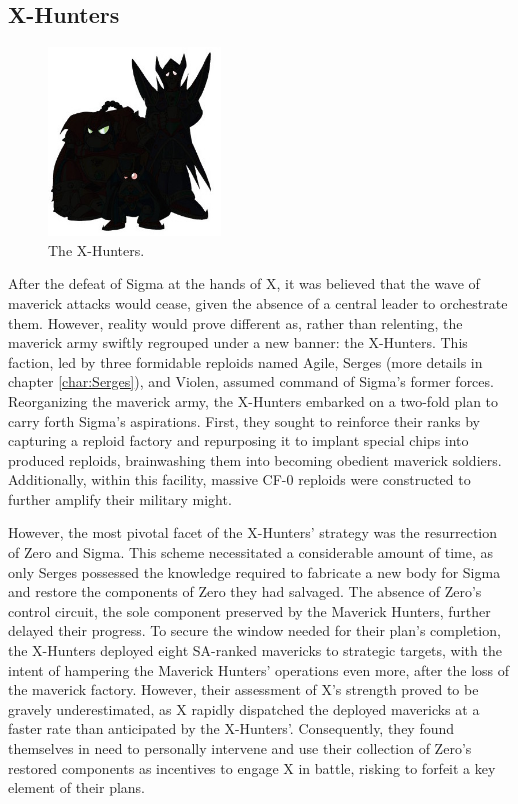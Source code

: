 \subsection{X-Hunters}
\begin{figure}[htp]
	\centering
	\includegraphics[height=5cm]{figures/X2/Enemies/X_Hunters.jpg}
	\caption{The X-Hunters.}
\end{figure}

After the defeat of Sigma at the hands of X, it was believed that the wave of maverick attacks would cease, given the absence of a central leader to orchestrate them. However, reality would prove different as, rather than relenting, the maverick army swiftly regrouped under a new banner: the X-Hunters. This faction, led by three formidable reploids named Agile, Serges (more details in chapter \ref{char:Serges}), and Violen, assumed command of Sigma's former forces. Reorganizing the maverick army, the X-Hunters embarked on a two-fold plan to carry forth Sigma's aspirations. First, they sought to reinforce their ranks by capturing a reploid factory and repurposing it to implant special chips into produced reploids, brainwashing them into becoming obedient maverick soldiers. Additionally, within this facility, massive CF-0 reploids were constructed to further amplify their military might.

However, the most pivotal facet of the X-Hunters' strategy was the resurrection of Zero and Sigma. This scheme necessitated a considerable amount of time, as only Serges possessed the knowledge required to fabricate a new body for Sigma and restore the components of Zero they had salvaged. The absence of Zero's control circuit, the sole component preserved by the Maverick Hunters, further delayed their progress. To secure the window needed for their plan's completion, the X-Hunters deployed eight SA-ranked mavericks to strategic targets, with the intent of hampering the Maverick Hunters' operations even more, after the loss of the maverick factory. However, their assessment of X's strength proved to be gravely underestimated, as X rapidly dispatched the deployed mavericks at a faster rate than anticipated by the X-Hunters'. Consequently, they found themselves in need to personally intervene and use their collection of Zero's restored components as incentives to engage X in battle, risking to forfeit a key element of their plans.

